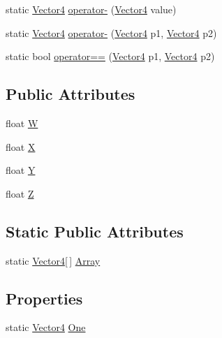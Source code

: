 \begin{DoxyCompactItemize}
\item 
static \hyperlink{structMicrosoft_1_1Xna_1_1Framework_1_1Vector4}{Vector4} \hyperlink{structMicrosoft_1_1Xna_1_1Framework_1_1Vector4_a80f495f8bccf98cec8381cd8240eade3}{operator-\/} (\hyperlink{structMicrosoft_1_1Xna_1_1Framework_1_1Vector4}{Vector4} value)
\item 
static \hyperlink{structMicrosoft_1_1Xna_1_1Framework_1_1Vector4}{Vector4} \hyperlink{structMicrosoft_1_1Xna_1_1Framework_1_1Vector4_a117c18886093887beb312d4735870215}{operator-\/} (\hyperlink{structMicrosoft_1_1Xna_1_1Framework_1_1Vector4}{Vector4} p1, \hyperlink{structMicrosoft_1_1Xna_1_1Framework_1_1Vector4}{Vector4} p2)
\item 
static bool \hyperlink{structMicrosoft_1_1Xna_1_1Framework_1_1Vector4_a2762b326b072d24703da6fa5bad39cc6}{operator==} (\hyperlink{structMicrosoft_1_1Xna_1_1Framework_1_1Vector4}{Vector4} p1, \hyperlink{structMicrosoft_1_1Xna_1_1Framework_1_1Vector4}{Vector4} p2)
\end{DoxyCompactItemize}
\subsection*{Public Attributes}
\begin{DoxyCompactItemize}
\item 
float \hyperlink{structMicrosoft_1_1Xna_1_1Framework_1_1Vector4_a9f617b4ebd9b59cdac29c77f13ace604}{W}
\item 
float \hyperlink{structMicrosoft_1_1Xna_1_1Framework_1_1Vector4_ab3c4b737dfc5c78a6aba50dda616f7c3}{X}
\item 
float \hyperlink{structMicrosoft_1_1Xna_1_1Framework_1_1Vector4_ac915220fb659eb2c5958a1ccd81b80d4}{Y}
\item 
float \hyperlink{structMicrosoft_1_1Xna_1_1Framework_1_1Vector4_aa65967cca170d24dcd0d555df0d5ee4f}{Z}
\end{DoxyCompactItemize}
\subsection*{Static Public Attributes}
\begin{DoxyCompactItemize}
\item 
static \hyperlink{structMicrosoft_1_1Xna_1_1Framework_1_1Vector4}{Vector4}\mbox{[}$\,$\mbox{]} \hyperlink{structMicrosoft_1_1Xna_1_1Framework_1_1Vector4_a6301c607d68db0e1dc838f61fa6bccef}{Array}
\end{DoxyCompactItemize}
\subsection*{Properties}
\begin{DoxyCompactItemize}
\item 
static \hyperlink{structMicrosoft_1_1Xna_1_1Framework_1_1Vector4}{Vector4} \hyperlink{structMicrosoft_1_1Xna_1_1Framework_1_1Vector4_a11ccebf80133d64d78a23d5f9bffcdff}{One}
\end{DoxyCompactItemize}


